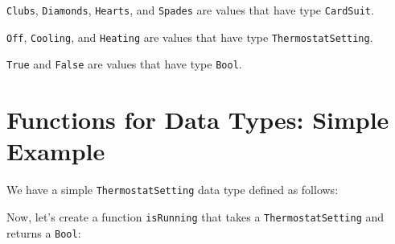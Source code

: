 \texttt{Clubs}, \texttt{Diamonds}, \texttt{Hearts}, and \texttt{Spades}
are values that have type \texttt{CardSuit}.

\begin{Shaded}
\begin{Highlighting}[]
  \OtherTok{=}  \OperatorTok{|}  \OperatorTok{|} 
\end{Highlighting}
\end{Shaded}

\texttt{Off}, \texttt{Cooling}, and \texttt{Heating} are values that
have type \texttt{ThermostatSetting}.

\begin{Shaded}
\begin{Highlighting}[]
  \OtherTok{=}  \OperatorTok{|} 
\end{Highlighting}
\end{Shaded}

\texttt{True} and \texttt{False} are values that have type
\texttt{Bool}.

\hypertarget{functions-for-data-types-simple-example}{%
\section{Functions for Data Types: Simple
Example}\label{functions-for-data-types-simple-example}}

We have a simple \texttt{ThermostatSetting} data type defined as
follows:

\begin{Shaded}
\begin{Highlighting}[]
  
\OtherTok{=}  
    \OperatorTok{|}  
    \OperatorTok{|} 
     
\end{Highlighting}
\end{Shaded}

Now, let's create a function \texttt{isRunning} that takes a
\texttt{ThermostatSetting} and returns a \texttt{Bool}:

\begin{Shaded}
\begin{Highlighting}[]
  \OtherTok{{-}\textgreater{}} 
\end{Highlighting}
\end{Shaded}


